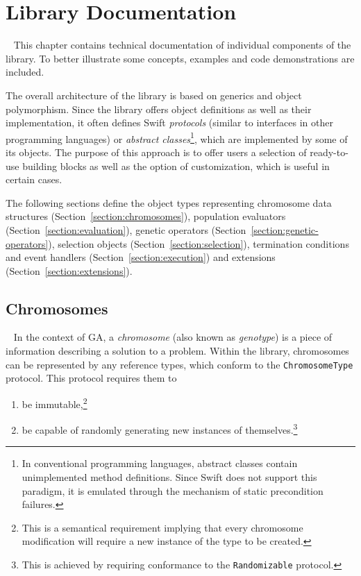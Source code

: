 \chapter{Library Documentation}~\label{chapter:documentation}
This chapter contains technical documentation of individual components of the library. To better illustrate some concepts, examples and code demonstrations are included.

The overall architecture of the library is based on generics and object polymorphism. Since the library offers object definitions as well as their implementation, it often defines Swift \textit{protocols} (similar to interfaces in other programming languages) or \textit{abstract classes}\footnote{In conventional programming languages, abstract classes contain unimplemented method definitions. Since Swift does not support this paradigm, it is emulated through the mechanism of static precondition failures.}, which are implemented by some of its objects. The purpose of this approach is to offer users a selection of ready-to-use building blocks as well as the option of customization, which is useful in certain cases.

The following sections define the object types representing chromosome data structures (Section~\ref{section:chromosomes}), population evaluators (Section~\ref{section:evaluation}), genetic operators (Section~\ref{section:genetic-operators}), selection objects (Section~\ref{section:selection}), termination conditions and event handlers (Section~\ref{section:execution}) and extensions (Section~\ref{section:extensions}).

\section{Chromosomes}~\label{section:chromosomes}
In the context of GA, a \textit{chromosome} (also known as \textit{genotype}) is a piece of information describing a solution to a problem. \cite{GaPracticalHandbook} Within the library, chromosomes can be represented by any reference types, which conform to the \texttt{ChromosomeType} protocol. This protocol requires them to
~
\begin{enumerate}
	\item be immutable,\footnote{This is a semantical requirement implying that every chromosome modification will require a new instance of the type to be created.}
	\item be capable of randomly generating new instances of themselves.\footnote{This is achieved by requiring conformance to the \texttt{Randomizable} protocol.}
\end{enumerate}

